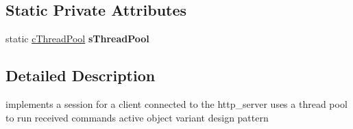 \subsection*{Static Private Attributes}
\begin{DoxyCompactItemize}
\item 
\hypertarget{classengine_1_1cSession_a2f0a00f5302fdf8d88d4738c448ce4fa}{static \hyperlink{classengine_1_1cThreadPool}{c\-Thread\-Pool} {\bfseries s\-Thread\-Pool}}\label{classengine_1_1cSession_a2f0a00f5302fdf8d88d4738c448ce4fa}

\end{DoxyCompactItemize}


\subsection{Detailed Description}
implements a session for a client connected to the http\-\_\-server uses a thread pool to run received commands active object variant design pattern 

